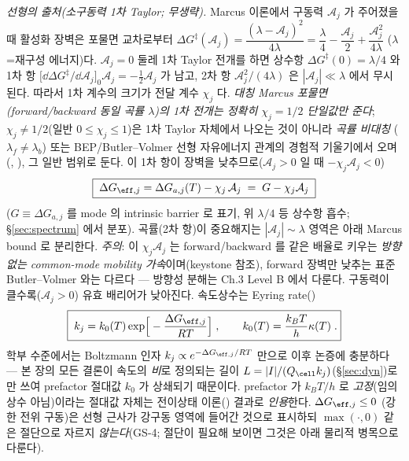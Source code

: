 \emph{선형의 출처(소구동력 1차 Taylor; 무생략).} Marcus 이론에서 구동력 $\mathcal A_j$ 가 주어졌을 때
활성화 장벽은 포물면 교차로부터 $\Delta G^\ddagger(\mathcal A_j)=\dfrac{(\lambda-\mathcal A_j)^2}{4\lambda}
=\dfrac{\lambda}{4}-\dfrac{\mathcal A_j}{2}+\dfrac{\mathcal A_j^2}{4\lambda}$ ($\lambda$=재구성 에너지)다.
$\mathcal A_j=0$ 둘레 1차 Taylor 전개를 하면 상수항 $\Delta G^\ddagger(0)=\lambda/4$ 와 1차 항
$\big[\dd\Delta G^\ddagger/\dd\mathcal A_j\big]_{0}\mathcal A_j=-\tfrac12\mathcal A_j$ 가 남고, 2차 항
$\mathcal A_j^2/(4\lambda)$ 은 $|\mathcal A_j|\ll\lambda$ 에서 무시된다. 따라서 1차 계수의 크기가 전달 계수
$\chi_j$ 다. \emph{대칭 Marcus 포물면(forward/backward 동일 곡률 $\lambda$)의 1차 전개는 정확히 $\chi_j=1/2$
단일값만 준다}; $\chi_j\ne1/2$(일반 $0\le\chi_j\le1$)은 1차 Taylor 자체에서 나오는 것이 아니라 \emph{곡률 비대칭}
($\lambda_f\ne\lambda_b$) 또는 BEP/Butler--Volmer 선형 자유에너지 관계의 경험적 기울기에서 오며
(, \cite{evanspolanyi1938,bardfaulkner}), 그 일반 범위로 둔다. 이 1차 항이 장벽을 낮추므로($\mathcal A_j>0$ 일 때 $-\chi_j\mathcal A_j<0$)
\begin{equation}
\boxed{\;\Delta G_{\eff,j}=\Delta G_{a,j}(T)-\chi_j\,\mathcal A_j\;=\;G-\chi_j\mathcal A_j\;}
\label{eq:Geff}
\end{equation}
($G\equiv\Delta G_{a,j}$ 를 mode 의 intrinsic barrier 로 표기, 위 $\lambda/4$ 등 상수항 흡수;
\S\ref{sec:spectrum} 에서 분포). 곡률(2차 항)이 중요해지는 $|\mathcal A_j|\sim\lambda$ 영역은 아래 Marcus
bound 로 분리한다. \emph{주의}: 이 $\chi_j\mathcal A_j$ 는 forward/backward 를 같은 배율로 키우는
\emph{방향 없는 common-mode mobility 가속}이며(keystone 참조), forward 장벽만 낮추는 표준 Butler--Volmer
와는 다르다 — 방향성 분해는 Ch.3 Level B 에서 다룬다. 구동력이
클수록($\mathcal A_j>0$) 유효 배리어가 낮아진다. 속도상수는 Eyring rate()
\begin{equation}
\boxed{\;k_j=k_0(T)\exp\!\Big[-\frac{\Delta G_{\eff,j}}{RT}\Big]\;,\qquad k_0(T)=\frac{k_BT}{h}\kappa(T)\;.}
\label{eq:kact}
\end{equation}
학부 수준에서는 Boltzmann 인자 $k_j\propto e^{-\Delta G_{\eff,j}/RT}$ 만으로 이후 논증에 충분하다 — 본 장의
모든 결론이 속도의 \emph{비}로 정의되는 길이 $L=|I|/(Q_\cell k_j)$(\S\ref{sec:dyn})로만 쓰여 prefactor 절대값
$k_0$ 가 상쇄되기 때문이다. prefactor 가 $k_BT/h$ 로 \emph{고정}(임의 상수 아님)이라는 절대값 자체는 전이상태
이론(\cite{eyring1935}) 결과로 \emph{인용}한다. $\Delta G_{\eff,j}\le0$
(강한 전위 구동)은 선형 근사가 강구동 영역에 들어간 것으로 표시하되 $\max(\cdot,0)$ 같은 절단으로 자르지
\emph{않는다}(GS-4; 절단이 필요해 보이면 그것은 아래 물리적 병목으로 다룬다).
